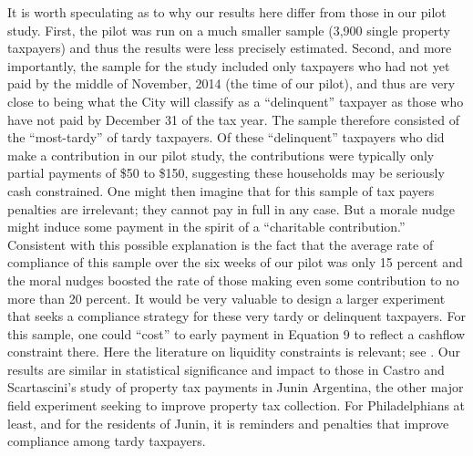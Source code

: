 It is worth speculating as to why our results here differ from those
in our pilot study.  First, the pilot was run on a much smaller sample
(3,900 single property taxpayers) and thus the results were less
precisely estimated.  Second, and more importantly, the sample for the
study included only taxpayers who had not yet paid by the middle of
November, 2014 (the time of our pilot), and thus are very close to
being what the City will classify as a ``delinquent'' taxpayer as those
who have not paid by December 31 of the tax year.  The sample
therefore consisted of the ``most-tardy'' of tardy taxpayers.  Of
these ``delinquent'' taxpayers who did make a contribution in our pilot study, the contributions were typically only partial payments of
\$50 to \$150, suggesting these households may be seriously cash
constrained.  One might then imagine that for this sample of tax
payers penalties are irrelevant; they cannot pay in full in any case.
But a morale nudge might induce some payment in the spirit of a
``charitable contribution.''  Consistent with this possible explanation
is the fact that the average rate of compliance of this sample over
the six weeks of our pilot was only 15 percent and the moral nudges
boosted the rate of those making even some contribution to no more
than 20 percent.  It would be very valuable to design a larger
experiment that seeks a compliance strategy for these very tardy or
delinquent taxpayers. For this sample, one could ``cost'' to early payment in Equation 9 to reflect a cashflow constraint there. Here the literature on liquidity constraints is relevant; see \cite{zeldes1989consumption}. Our results are similar in statistical
significance and impact to those in Castro and Scartascini's
\citeyearpar{castro} study of property tax payments in Junin Argentina,
the other major field experiment seeking to improve property tax
collection.  For Philadelphians at least, and for the residents of
Junin, it is reminders and penalties that improve compliance among
tardy taxpayers.

